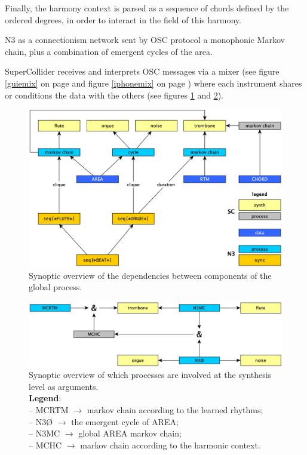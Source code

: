 \documentclass{article}
\begin{document}
Finally, the harmony context is parsed as a sequence of chords defined by the ordered degrees, in order to interact in the field of this harmony.

\bigskip

N3 as a connectionism network sent by OSC protocol a monophonic Markov chain, plus a combination of emergent cycles of the area.

SuperCollider receives and interprets OSC messages via a mixer (see figure \ref{guiemix} on page \pageref{guiemix} and figure \ref{iphonemix} on page \pageref{iphonemix}) where each instrument shares or conditions the data with the others (see figures \ref{deps} and  \ref{share}).

\begin{figure}[htbp]
\centering
\includegraphics[width=\textwidth]{../img/9902}
\caption{Synoptic overview of the dependencies between components of the global process.}
\label{deps}
\end{figure}

\begin{figure}[htbp]
\centering
\includegraphics[width=\textwidth]{../img/9903}
\caption{Synoptic overview of which processes are involved at the synthesis level as arguments. \\ \textbf{Legend}:\\ -- \textsf{\footnotesize MCRTM} $\rightarrow$ markov chain according to the learned rhythms;\\ -- \textsf{\footnotesize N3Ø} $\rightarrow$ the emergent cycle of AREA;\\ -- \textsf{\footnotesize N3MC} $\rightarrow$ global AREA markov chain;\\ --   \textsf{\footnotesize MCHC} $\rightarrow$ markov chain according to the harmonic context.}
\label{share}
\end{figure}
\end{document}
